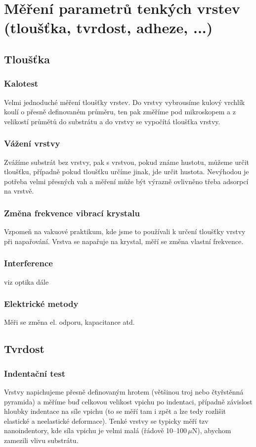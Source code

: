\documentclass[12pt]{article}
\begin{document}
\section{Měření parametrů tenkých vrstev (tloušťka, tvrdost, adheze, ...) }
\subsection{Tloušťka}
\subsubsection{Kalotest}
Velmi jednoduché měření tloušťky vrstev. Do vrstvy vybrousíme kulový vrchlík koulí o přesně definovaném průměru, ten pak změříme pod mikroskopem a z velikostí průmětů do substrátu a do vrstvy se vypočítá tloušťka vrstvy.
\subsubsection{Vážení vrstvy}
Zvážíme substrát bez vrstvy, pak s vrstvou, pokud známe hustotu, můžeme určit tloušťku, případně pokud tloušťku určíme jinak, jde určit hustota. Nevýhodou je potřeba velmi přesných vah a měření může být výrazně ovlivněno třeba adsorpcí na vrstvě.
\subsubsection{Změna frekvence vibrací krystalu}
Vzpomeň na vakuové praktikum, kde jsme to používali k určení tloušťky vrstvy při napařování. Vrstva se napařuje na krystal, měří se změna vlastní frekvence.
\subsubsection{Interference}
viz optika dále
\subsubsection{Elektrické metody}
Měři se změna el. odporu, kapacitance atd.


\subsection{Tvrdost}
\subsubsection{Indentační test}
Vrstvy napichujeme přesně definovaným hrotem (většinou troj nebo čtyřstěnná pyramida) a měříme buď celkovou velikost vpichu po indentaci, případně závislost hloubky indentace na síle vpichu (to se měří tam i zpět a lze tedy rozlišit elastické a neelastické deformace). Tenké vrstvy se typicky měří tzv nanoindentory, kde síla vpichu je velmi malá (řádově 10--100\,$\mu$N), abychom zamezili vlivu substrátu.
\end{document}
